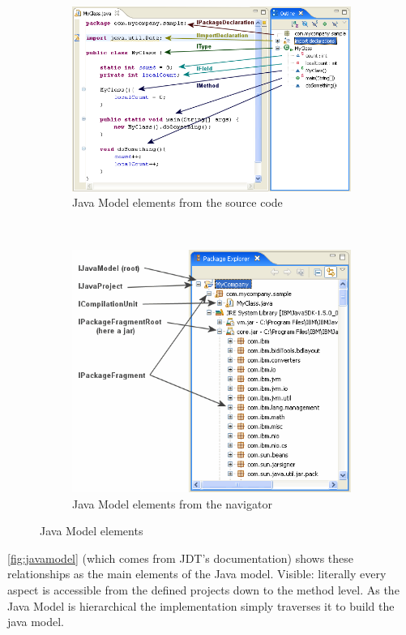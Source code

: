 \begin{figure} 
        \centering
        \begin{subfigure}[b]{0.5\textwidth}
                \centering
                \includegraphics[width=\textwidth]{figures/javamodel2.png}
                \caption{Java Model elements from the source code}
                \label{fig:javamodel2.png}
        \end{subfigure}~
        \begin{subfigure}[b]{0.5\textwidth}
                \centering
                \includegraphics[width=\textwidth]{figures/javamodel1.png}
                \caption{Java Model elements from the navigator}
                \label{fig:javamodel1.png}
        \end{subfigure}
        \caption{Java Model elements}\label{fig:javamodel}
\end{figure}
\autoref{fig:javamodel} (which comes from JDT's documentation) shows these
relationships as the main elements of the Java model. Visible: literally every aspect 
is accessible from the defined projects down to the method level. As the Java Model 
is hierarchical the implementation simply traverses it to build the java model. 

